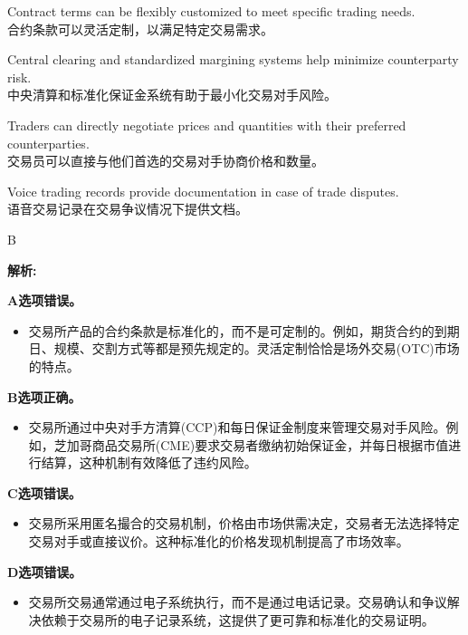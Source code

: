 \documentclass{article}
\newenvironment{explanation}
{\textbf{解析:}\par}
{\par}
\begin{document}
    \begin{choices}
        \item Contract terms can be flexibly customized to meet specific trading needs.\\
        合约条款可以灵活定制，以满足特定交易需求。
        
        \item Central clearing and standardized margining systems help minimize counterparty risk.\\
        中央清算和标准化保证金系统有助于最小化交易对手风险。
        
        \item Traders can directly negotiate prices and quantities with their preferred counterparties.\\
        交易员可以直接与他们首选的交易对手协商价格和数量。
        
        \item Voice trading records provide documentation in case of trade disputes.\\
        语音交易记录在交易争议情况下提供文档。
    \end{choices}
    
    \begin{correctanswer}
    B
    \end{correctanswer}
    
    \begin{explanation}
   
    
    \textbf{A选项错误。}
    \begin{itemize}
        \item 交易所产品的合约条款是标准化的，而不是可定制的。例如，期货合约的到期日、规模、交割方式等都是预先规定的。灵活定制恰恰是场外交易(OTC)市场的特点。
    \end{itemize}
    
    \textbf{B选项正确。}
    \begin{itemize}
        \item 交易所通过中央对手方清算(CCP)和每日保证金制度来管理交易对手风险。例如，芝加哥商品交易所(CME)要求交易者缴纳初始保证金，并每日根据市值进行结算，这种机制有效降低了违约风险。
    \end{itemize}
    
    \textbf{C选项错误。}
    \begin{itemize}
        \item 交易所采用匿名撮合的交易机制，价格由市场供需决定，交易者无法选择特定交易对手或直接议价。这种标准化的价格发现机制提高了市场效率。
    \end{itemize}
    
    \textbf{D选项错误。}
    \begin{itemize}
        \item 交易所交易通常通过电子系统执行，而不是通过电话记录。交易确认和争议解决依赖于交易所的电子记录系统，这提供了更可靠和标准化的交易证明。
    \end{itemize}
    
    \end{explanation}
    
\end{document}
